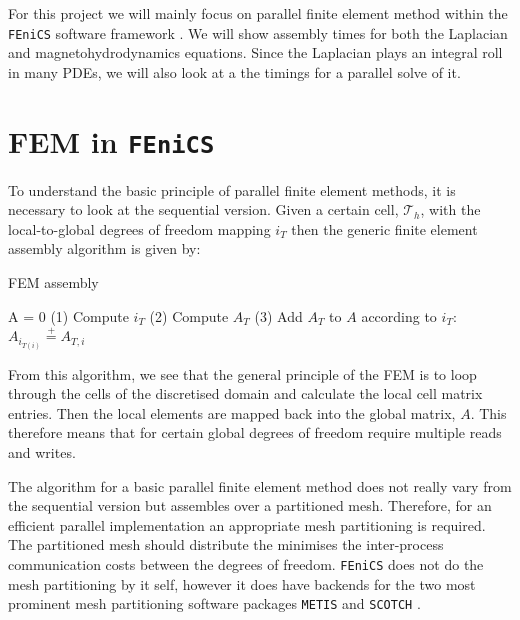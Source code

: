 \documentclass[11pt]{article}
\newcommand{\fenics}{{\tt FEniCS} }
\begin{document}
For this project we will mainly focus on parallel finite element method within the \fenics  software framework \cite{wells2012automated}. We will show assembly times for both the Laplacian and magnetohydrodynamics equations. Since the Laplacian plays an integral roll in many PDEs, we will also look at a the timings for a parallel solve of it.


\section{FEM in \fenics}

To understand the basic principle of parallel finite element methods, it is necessary to look at the sequential version. Given a certain cell, $\mathcal{T}_h$, with the local-to-global degrees of freedom mapping $i_T$ then the generic finite element assembly algorithm is given by:
\begin{algorithm}

FEM assembly
    \begin{algorithmic}[1]
    \State A = 0
        \State (1) Compute $i_T$
        \State (2) Compute $A_T$
        \State (3) Add $A_T$ to $A$ according to $i_T$:
            \State $ A_{i_{T(i)}} \stackrel{+}{=} A_{T,i}$
        \EndFor
    \EndFor
    \end{algorithmic}
\end{algorithm}

From this algorithm, we see that the general principle of the FEM is to loop through the cells of the discretised domain and calculate the local cell matrix entries. Then the local elements are mapped back into the global matrix, $A$. This therefore means that for certain global degrees of freedom require multiple reads and writes.

The algorithm for a basic parallel finite element method does not really vary from the sequential version but assembles over a partitioned mesh. Therefore, for an efficient parallel implementation an appropriate mesh partitioning is required. The partitioned mesh should distribute the minimises the inter-process communication costs between the degrees of freedom. \fenics does not do the mesh partitioning by it self, however it does have backends for the two most prominent mesh partitioning software packages {\tt METIS} \cite{metis} and {\tt SCOTCH} \cite{scotch}.

\end{document}
